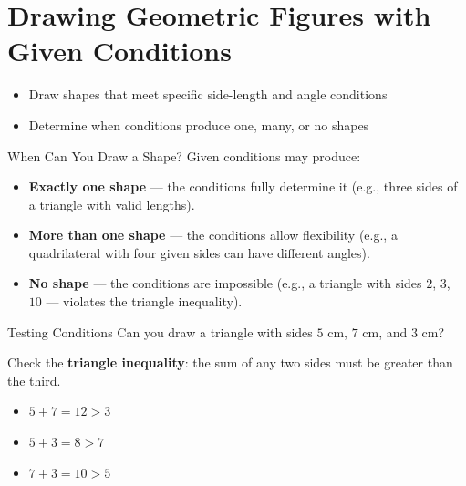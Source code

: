 \section{Drawing Geometric Figures with Given Conditions}

\begin{learningGoals}
\begin{itemize}
    \item Draw shapes that meet specific side-length and angle conditions
    \item Determine when conditions produce one, many, or no shapes
\end{itemize}
\end{learningGoals}

\begin{conceptBox}{When Can You Draw a Shape?}
Given conditions may produce:
\begin{itemize}[leftmargin=*]
    \item \textbf{Exactly one shape} — the conditions fully determine it (e.g., three sides of a triangle with valid lengths).
    \item \textbf{More than one shape} — the conditions allow flexibility (e.g., a quadrilateral with four given sides can have different angles).
    \item \textbf{No shape} — the conditions are impossible (e.g., a triangle with sides $2$, $3$, $10$ — violates the triangle inequality).
\end{itemize}
\end{conceptBox}

\begin{workedExample}{Testing Conditions}
Can you draw a triangle with sides $5$ cm, $7$ cm, and $3$ cm?

Check the \textbf{triangle inequality}: the sum of any two sides must be greater than the third.
\begin{itemize}[leftmargin=*]
    \item $5 + 7 = 12 > 3$ \checkmark
    \item $5 + 3 = 8 > 7$ \checkmark
    \item $7 + 3 = 10 > 5$ \checkmark
\end{itemize}
\end{workedExample}


